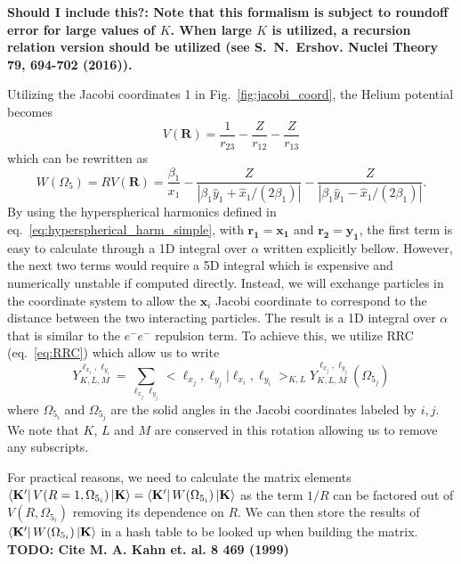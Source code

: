 \textbf{Should I include this?: Note that this formalism is subject to roundoff error for large values of $K$. When large $K$ is utilized, a recursion relation version should be utilized (see S.\ N.\ Ershov. Nuclei Theory \textbf{79}, 694-702 (2016)).}

Utilizing the Jacobi coordinates 1 in Fig.~\ref{fig:jacobi_coord}, the Helium potential becomes
\begin{equation}
    V(\mathbf{R}) = \frac{1}{r_{23}} - \frac{Z}{r_{12}} - \frac{Z}{r_{13}}
\end{equation}
which can be rewritten as 
\begin{equation}
    W(\Omega_5) = R V(\mathbf{R}) = \frac{\beta_1}{x_1} - \frac{Z}{|\beta_1\hat{y}_1+\hat{x}_1/(2\beta_1)|} - \frac{Z}{|\beta_1\hat{y}_1-\hat{x}_1/(2\beta_1)|}.
\end{equation}
By using the hyperspherical harmonics defined in eq.~\ref{eq:hyperspherical_harm_simple}, with $\mathbf{r_1}=\mathbf{x_1}$ and $\mathbf{r_2}=\mathbf{y_1}$, the first term is easy to calculate through a 1D integral over $\alpha$ written explicitly bellow. However, the next two terms would require a 5D integral which is expensive and numerically unstable if computed directly. Instead, we will exchange particles in the coordinate system to allow the $\mathbf{x}_i$ Jacobi coordinate to correspond to the distance between the two interacting particles. The result is a 1D integral over $\alpha$ that is similar to the $e^-e^-$ repulsion term. To achieve this, we utilize RRC (eq.~\ref{eq:RRC}) which allow us to write
\begin{equation}
    Y^{\ell_{x_i},\ell_{y_i}}_{K,L,M} = \sum\limits_{\ell_{x_j}\ell_{y_j}} <\ell_{x_j},\ell_{y_j}|\ell_{x_i},\ell_{y_i}>_{K,L} Y^{\ell_{x_j},\ell_{y_j}}_{K,L,M}(\Omega_{5_j})
\end{equation}
where $\Omega_{5_i}$ and $\Omega_{5_j}$ are the solid angles in the Jacobi coordinates labeled by $i,j$. We note that $K$, $L$ and $M$ are conserved in this rotation allowing us to remove any subscripts. 

For practical reasons, we need to calculate the matrix elements $\bra{\mathbf{K}'}V(R=1,\Omega_{5_i})\ket{\mathbf{K}} = \bra{\mathbf{K}'}W(\Omega_{5_i})\ket{\mathbf{K}}$ as the term $1/R$ can be factored out of $V(R,\Omega_{5_i})$ removing its dependence on $R$. We can then store the results of $\bra{\mathbf{K}'}W(\Omega_{5_i})\ket{\mathbf{K}}$ in a hash table to be looked up when building the matrix. \textbf{TODO: Cite M. A. Kahn et. al. \textbf{8} 469 (1999)}

